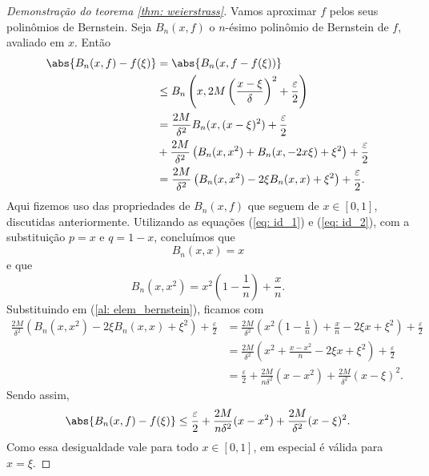 \begin{proof}[Demonstração do teorema \ref{thm: weierstrass}]
    Vamos aproximar \( f \) pelos seus polinômios de Bernstein.
    Seja \( B_{ n }(x, f) \) o \( n \)-ésimo polinômio de Bernstein de \( f \), avaliado em \( x \).
    Então
    \begin{align}
        \abs{ B_{ n } (x, f) - f(\xi) }
        &= \abs{B_{ n } (x, f - f(\xi))} \\
        &\leq  B_{ n } \left( x, 2M \left( \frac{ x - \xi }{ \delta } \right)^2 + \frac{ \varepsilon }{ 2 } \right) \\
        &= \frac{ 2M }{ \delta^2 } B_{ n } (x, ( x - \xi )^2) + \frac{ \varepsilon }{ 2 } \\
        &+ \frac{ 2M }{ \delta^2 } \left( B_{ n } (x, x^2) + B_{ n } (x, -2 x \xi) + \xi^2 \right) + \frac{ \varepsilon }{ 2 } \\
        &= \frac{ 2M }{ \delta^2 } \left( B_{ n } (x, x^2) - 2 \xi B_{ n } (x, x) + \xi^2 \right) + \frac{ \varepsilon }{ 2 }
        \label{al: elem_bernstein}
    .\end{align}
    Aqui fizemos uso das propriedades de \( B_{ n } (x, f) \) que seguem de \( x \in [0, 1] \), discutidas anteriormente.
    Utilizando as equações (\ref{eq: id_1}) e (\ref{eq: id_2}), com a substituição \( p = x \) e \( q = 1 - x \), concluímos que \[
        B_{ n } (x, x) = x
    \]
    e que \[
        B_{ n } (x, x^2) = x^2 \left( 1 - \frac{ 1 }{ n } \right) + \frac{ x }{ n }
    .\]
    Substituindo em (\ref{al: elem_bernstein}), ficamos com
    \begin{align}
        \frac{ 2M }{ \delta^2 } \left( B_{ n } (x, x^2) - 2 \xi B_{ n } (x, x) + \xi^2 \right) + \frac{ \varepsilon }{ 2 } &=
        \frac{ 2M }{ \delta^2 } \left( 
            x^2 \left( 1 - \frac{ 1 }{ n } \right) + \frac{ x }{ n }
            - 2 \xi x
            + \xi^2
         \right) + \frac{ \varepsilon }{ 2 } \\
         &= \frac{ 2M }{ \delta^2 } \left( 
             x^2 + \frac{ x - x^2 }{ n } - 2 \xi x + \xi^2
          \right) + \frac{ \varepsilon }{ 2 } \\
         &= \frac{ \varepsilon }{ 2 } + \frac{ 2M }{ n \delta^2 } ( x - x^2 ) + \frac{ 2M }{ \delta^2 } ( x - \xi )^2
    .\end{align}
    Sendo assim, 
    \begin{equation}
        \abs{ B_{ n } (x, f) - f(\xi) } \leq \frac{ \varepsilon }{ 2 } + \frac{ 2M }{ n \delta^2 } ( x - x^2 ) + \frac{ 2M }{ \delta^2 } ( x - \xi )^2
    .\end{equation}
    Como essa desigualdade vale para todo \( x \in [0, 1] \), em especial é válida para \( x = \xi \).

\end{proof}
